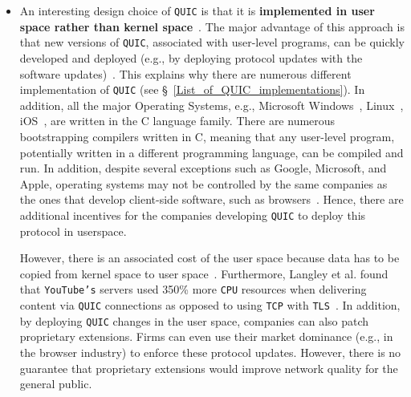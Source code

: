 \documentclass[12pt,a4paper,twoside,openright]{report}
\newcommand\note[2]{{\color{#1}\bf #2}}
\newcommand\simon[1]{\ifcomments{\note{cyan}{SM: #1}}\fi}
\begin{document}
\begin{itemize}
  

  \item 
  An interesting design choice of \texttt{QUIC} is that it is \textbf{implemented in user space rather than kernel space}~\cite{the-road-to-quic, Implementation_and_Performance_Evaluation_of_the_QUIC_Protocol_in_Linux_Kernel, quic-and-http-3-too-big-to-fail}.
  The major advantage of this approach is that new versions of \texttt{QUIC}, associated with user-level programs, can be quickly developed and deployed (e.g., by deploying protocol updates with the software updates)~\cite{the-road-to-quic}.
  This explains why there are numerous different implementation of \texttt{QUIC} (see \S~\ref{List_of_QUIC_implementations}).
  In addition, all the major Operating Systems, e.g., Microsoft Windows~\cite{OS_implementations}, Linux~\cite{OS_implementations, linux_kernel_programming_language}, iOS~\cite{OS_implementations, IOKitFundamentals}, are written in the C language family.
  There are numerous bootstrapping compilers written in C, meaning that any user-level program, potentially written in a different programming language, can be compiled and run.
  In addition, despite several exceptions such as Google, Microsoft, and Apple, operating systems may not be controlled by the same companies as the ones that develop client-side software, such as browsers~\cite{2016-12-01-quic-tou}.
  Hence, there are additional incentives for the companies developing \texttt{QUIC} to deploy this protocol in userspace.
  
  However, there is an associated cost of the user space because data has to be copied from kernel space to user space~\cite{benchmarking-quic}.
  Furthermore, Langley et al. found that \texttt{YouTube's} servers used 350\% more \texttt{CPU} resources when delivering content via \texttt{QUIC} connections as opposed to using \texttt{TCP} with \texttt{TLS}~\cite{The_QUIC_Transport_Protocol_Design_and_Internet-Scale_Deployment}.
  In addition, by deploying \texttt{QUIC} changes in the user space, companies can also patch proprietary extensions.
  Firms can even use their market dominance (e.g., in the browser industry) to enforce these protocol updates.
  However, there is no guarantee that proprietary extensions would improve network quality for the general public. 





\end{itemize}
\end{document}

